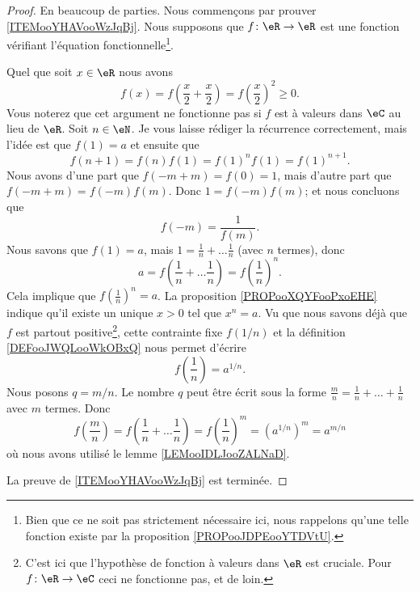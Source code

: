 \begin{proof}
	En beaucoup de parties. Nous commençons par prouver \ref{ITEMooYHAVooWzJqBj}. Nous supposons que \( f\colon \eR\to \eR\) est une fonction vérifiant l'équation fonctionnelle\footnote{Bien que ce ne soit pas strictement nécessaire ici, nous rappelons qu'une telle fonction existe par la proposition \ref{PROPooJDPEooYTDVtU}.}.
	\begin{subproof}
		\spitem[\( f(x)\geq 0\)]
		Quel que soit \( x\in \eR\) nous avons
		\begin{equation}
			f(x)=f(\frac{ x }{2}+\frac{ x }{2})=f(\frac{ x }{2})^2\geq 0.
		\end{equation}
		Vous noterez que cet argument ne fonctionne pas si \( f\) est à valeurs dans \( \eC\) au lieu de \( \eR\).
		\spitem[Pour \( n\in \eN\)]
		Soit \( n\in \eN\). Je vous laisse rédiger la récurrence correctement, mais l'idée est que \( f(1)=a\) et ensuite que
		\begin{equation}
			f(n+1)=f(n)f(1)=f(1)^nf(1)=f(1)^{n+1}.
		\end{equation}
		\spitem[Pour \( m\in \eZ\)]
		Nous avons d'une part que \( f(-m+m)=f(0)=1\), mais d'autre part que \( f(-m+m)=f(-m)f(m)\). Donc \( 1=f(-m)f(m)\); et nous concluons que
		\begin{equation}
			f(-m)=\frac{1}{ f(m) }.
		\end{equation}
		\spitem[Pour \( q=1/n\)]
		Nous savons que \( f(1)=a\), mais \( 1=\frac{1}{ n }+\ldots\frac{1}{ n }\) (avec \( n\) termes), donc
		\begin{equation}
			a=f(\frac{1}{ n }+\ldots \frac{1}{ n })=f(\frac{1}{ n })^n.
		\end{equation}
		Cela implique que \( f(\frac{1}{ n })^n=a\). La proposition \ref{PROPooXQYFooPxoEHE} indique qu'il existe un unique \( x>0\) tel que \( x^n=a\). Vu que nous savons déjà que \( f\) est partout positive\footnote{C'est ici que l'hypothèse de fonction à valeurs dans \( \eR\) est cruciale. Pour \( f\colon \eR\to \eC\) ceci ne fonctionne pas, et de loin.}, cette contrainte fixe \( f(1/n)\) et la définition \ref{DEFooJWQLooWkOBxQ} nous permet d'écrire
		\begin{equation}
			f(\frac{1}{ n })=a^{1/n}.
		\end{equation}
		\spitem[Pour \( q\in \eQ\)]
		Nous posons \( q=m/n\). Le nombre \( q\) peut être écrit sous la forme \( \frac{ m }{ n }=\frac{1}{ n }+\ldots +\frac{1}{ n }\) avec \( m\) termes. Donc
		\begin{equation}
			f(\frac{ m }{ n })=f(\frac{1}{ n }+\ldots \frac{1}{ n })=f(\frac{1}{ n })^{m}=(a^{1/n})^m=a^{m/n}
		\end{equation}
		où nous avons utilisé le lemme \ref{LEMooIDLJooZALNaD}.
	\end{subproof}
	La preuve de \ref{ITEMooYHAVooWzJqBj} est terminée.


\end{proof}
